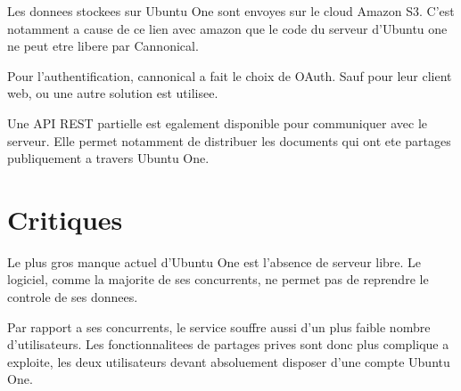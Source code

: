 Les donnees stockees sur Ubuntu One sont envoyes sur le cloud Amazon S3. C'est notamment a cause de ce lien avec amazon que le code du serveur d'Ubuntu one ne peut etre libere par Cannonical.

Pour l'authentification, cannonical a fait le choix de OAuth. Sauf pour leur client web, ou une autre solution est utilisee.

Une API REST partielle est egalement disponible pour communiquer avec le serveur. Elle permet notamment de distribuer les documents qui ont ete partages publiquement a travers Ubuntu One.

\section{Critiques}
Le plus gros manque actuel d'Ubuntu One est l'absence de serveur libre. Le logiciel, comme la majorite de ses concurrents, ne permet pas de reprendre le controle de ses donnees.

Par rapport a ses concurrents, le service souffre aussi d'un plus faible nombre d'utilisateurs. Les fonctionnalitees de partages prives sont donc plus complique a exploite, les deux utilisateurs devant absoluement disposer d'une compte Ubuntu One.
